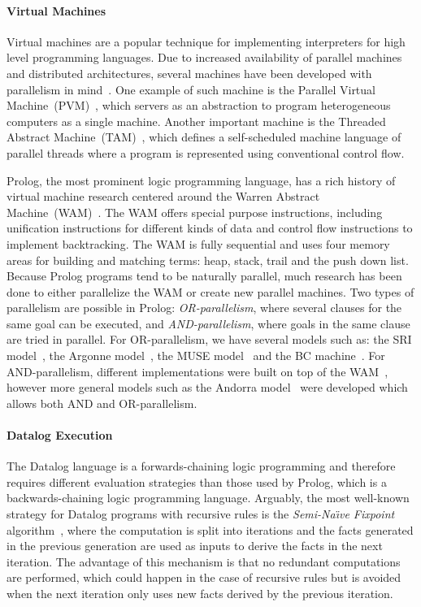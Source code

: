 \paragraph{Virtual Machines}

Virtual machines are a popular technique for implementing interpreters for high
level programming languages. Due to increased availability of parallel machines
and distributed architectures, several machines have been developed with
parallelism in mind~\cite{Kara:1997:AMM:265274}. One example of such machine is
the Parallel Virtual Machine~(PVM)~\cite{Sunderam90pvm:a}, which servers as an
abstraction to program heterogeneous computers as a single machine. Another
important machine is the Threaded Abstract
Machine~(TAM)~\cite{CullerGSvE93,goldstein-tr94}, which defines a self-scheduled
machine language of parallel threads where a program is represented using
conventional control flow.

Prolog, the most prominent logic programming language, has a rich history of
virtual machine research centered around the Warren Abstract
Machine~(WAM)~\cite{AICPub641:1983}. The WAM offers special purpose
instructions, including unification instructions for different kinds of data and
control flow instructions to implement backtracking. The WAM is fully sequential
and uses four memory areas for building and matching terms: heap, stack, trail
and the push down list. Because Prolog programs tend to be naturally parallel,
much research has been done to either parallelize the WAM or create new parallel
machines. Two types of parallelism are possible in Prolog:
\emph{OR-parallelism}, where several clauses for the same goal can be executed,
and \emph{AND-parallelism}, where goals in the same clause are tried in
parallel. For OR-parallelism, we have several models such as: the SRI
model~\cite{Warren:1987:OEM:67683.67699}, the Argonne
model~\cite{ButlerDLOOS88}, the MUSE model~\cite{Ali:1990fk} and the BC
machine~\cite{Ali88}. For AND-parallelism, different implementations were built
on top of the WAM~\cite{Hermenegildo:1986:AMB:913061,Lin:1988:AEL:900478},
however more general models such as the Andorra
model~\cite{Haridi:1990:KAP:87961.87964} were developed which allows both AND
and OR-parallelism.

\paragraph{Datalog Execution} The Datalog language is a forwards-chaining logic
programming and therefore requires different evaluation strategies than those
used by Prolog, which is a backwards-chaining logic programming language.
Arguably, the most well-known strategy for Datalog programs with recursive rules
is the \emph{Semi-Na\"{\i}ve Fixpoint}
algorithm~\cite{Balbin:1987:GDA:34657.34661}, where the computation is split
into iterations and the facts generated in the previous generation are used as
inputs to derive the facts in the next iteration. The advantage of this
mechanism is that no redundant computations are performed, which could happen in
the case of recursive rules but is avoided when the next iteration only uses new
facts derived by the previous iteration.
   
